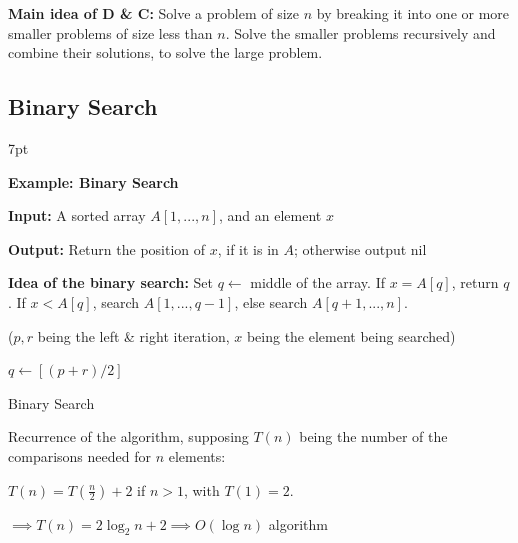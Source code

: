 \documentclass[10pt]{article}
\newenvironment{formal}[2]{%
	\def\FrameCommand{%
		\hspace{1pt}%
		{\color{#1}\vrule width 2pt}%
		{\color{#2}\vrule width 4pt}%
		\colorbox{#2}%
	}%
	\MakeFramed{\advance\hsize-\width\FrameRestore}%
	\noindent\hspace{-4.55pt}%
	\begin{adjustwidth}{}{7pt}%
		\vspace{2pt}\vspace{2pt}%
	}
	{%
		\vspace{2pt}\end{adjustwidth}\endMakeFramed%
}
\begin{document}
\textbf{Main idea of D \& C:} Solve a problem of size $n$ by breaking it into one or more smaller problems of size less than $n$. Solve the smaller problems recursively and combine their solutions, to solve the large problem.


\subsection{Binary Search}

\begin{formal}{Brown}{brownshade}
	
	\textbf{Example: Binary Search}
	
	\textbf{Input:} A sorted array $A[1,...,n]$, and an element $x$
	
	\textbf{Output:} Return the position of $x$, if it is in $A$; otherwise output nil
	
	\textbf{Idea of the binary search:} Set $q \gets$ middle of the array. If $x = A[q]$, return $q$. If $x < A[q]$, search $A[1,...,q-1]$, else search $A[q+1,...,n]$.
	
\end{formal}

\begin{algorithm}
	\SetAlgoLined
	($p, r$ being the left \& right iteration, $x$ being the element being searched){
		
		$q \gets [(p+r)/2]$
		
	}
	\caption{Binary Search}
\end{algorithm}

Recurrence of the algorithm, supposing $T(n)$ being the number of the comparisons needed for $n$ elements:

\noindent $T(n) = T(\frac{n}{2}) + 2$ if $n > 1$, with $T(1) = 2$.

$\implies T(n) = 2\log_2 n + 2 \implies O(\log n)$ algorithm
\end{document}
